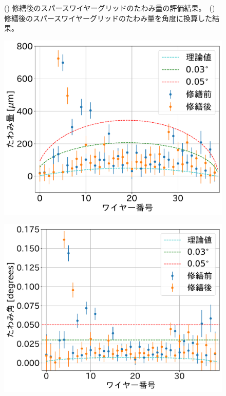 \documentclass[../../main.tex]{subfiles}
\begin{document}
\begin{figure}[H]
\begin{minipage}[b]{0.5\hsize}
        \subcaption{}
        \label{fig:wiresag_swg_sag_angle_result_after}
    \end{minipage}
    \caption{() 修繕後のスパースワイヤーグリッドのたわみ量の評価結果。\ 
             () 修繕後のスパースワイヤーグリッドのたわみ量を角度に換算した結果。}
    \label{fig:wiresag_swg_result_after}
\end{figure}
\begin{figure}[H]
    \begin{minipage}[b]{0.5\hsize}
        \centering
        \includegraphics[width=1.0\textwidth]{wiresag_swg/swg_sag_comparison.pdf}
        \subcaption{}
        \label{fig:wiresag_swg_sag_result_repair}
    \end{minipage}
    \begin{minipage}[b]{0.5\hsize}
        \centering
        \includegraphics[width=1.0\textwidth]{wiresag_swg/swg_sag_angle_comparison.pdf}

\end{minipage}
\end{figure}
\end{document}
